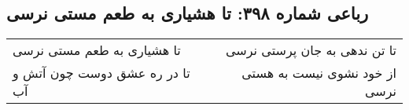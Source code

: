 \begin{center}
\section*{رباعی شماره ۳۹۸: تا هشیاری به طعم مستی نرسی}
\label{sec:sh398}
\begin{longtable}{l p{0.5cm} r}
تا هشیاری به طعم مستی نرسی
&&
تا تن ندهی به جان پرستی نرسی
\\
تا در ره عشق دوست چون آتش و آب
&&
از خود نشوی نیست به هستی نرسی
\\
\end{longtable}
\end{center}
